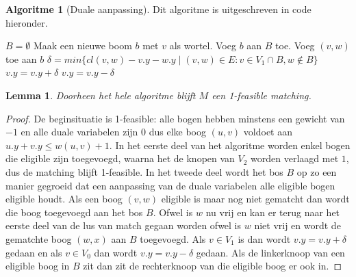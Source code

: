 \documentclass[conference]{IEEEtran}
\newtheorem{lemma}{Lemma}[section]
\theoremstyle{definition}
\newtheorem{algorithmm}{Algoritme}[section]
\theoremstyle{remark}
\begin{document}
\begin{algorithmm}[Duale aanpassing] \label{alg:match:match:2}
    Dit algoritme is uitgeschreven in code hieronder. %
\end{algorithmm}

\begin{algorithm}
    \caption{Duale aanpassing}
    \label{code:matching:matching:2}
    \begin{algorithmic}[0]
        \STATE $B = \emptyset$
            \STATE Maak een nieuwe boom $b$ met $v$ als wortel. Voeg $b$ aan $B$ toe.
                    \STATE Voeg $(v, w)$ toe aan $b$
                \ENDIF
            \ENDFOR
        \ENDFOR
        \STATE $\delta = min\{cl(v, w) - v.y - w.y \mid (v, w) \in E: v \in V_1 \cap B, w \notin B\}$
            \STATE $v.y = v.y + \delta$
        \ENDFOR
            \STATE $v.y = v.y - \delta$
        \ENDFOR
    \end{algorithmic}
\end{algorithm}


\begin{lemma}
    Doorheen het hele algoritme blijft $M$ een 1-feasible matching.
\end{lemma}
\begin{proof}
    De beginsituatie is 1-feasible: alle bogen hebben minstens een gewicht van $-1$ en alle duale variabelen zijn $0$ dus elke boog $(u, v)$ voldoet aan $u.y + v.y \leq w(u, v) + 1$. In het eerste deel van het algoritme worden enkel bogen die eligible zijn toegevoegd, waarna het de knopen van $V_2$ worden verlaagd met $1$, dus de matching blijft 1-feasible. In het tweede deel wordt het bos $B$ op zo een manier gegroeid dat een aanpassing van de duale variabelen alle eligible bogen eligible houdt. Als een boog $(v, w)$ eligible is maar nog niet gematcht dan wordt die boog toegevoegd aan het bos $B$. Ofwel is $w$ nu vrij en kan er terug naar het eerste deel van de lus van match gegaan worden ofwel is $w$ niet vrij en wordt de gematchte boog $(w, x)$ aan $B$ toegevoegd. Als $v \in V_1$ is dan wordt $v.y = v.y + \delta$ gedaan en als $v \in V_0$ dan wordt $v.y = v.y - \delta$ gedaan. Als de linkerknoop van een eligible boog in $B$ zit dan zit de rechterknoop van die eligible boog er ook in.
\end{proof}
\end{document}
